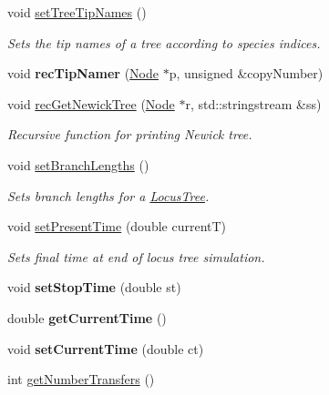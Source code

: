 \begin{DoxyCompactItemize}
void \mbox{\hyperlink{class_locus_tree_aa35f5146960c0af19975152ae6f47e8c}{set\+Tree\+Tip\+Names}} ()
\begin{DoxyCompactList}\small\item\em Sets the tip names of a tree according to species indices. \end{DoxyCompactList}\item 
\mbox{\label{class_locus_tree_ac9074deb777a4a09823a2a107ecd81c6}} 
void {\bfseries rec\+Tip\+Namer} (\mbox{\hyperlink{class_node}{Node}} $\ast$p, unsigned \&copy\+Number)
\item 
void \mbox{\hyperlink{class_locus_tree_ae7ea80d7265d1a65949f32968b1ebb89}{rec\+Get\+Newick\+Tree}} (\mbox{\hyperlink{class_node}{Node}} $\ast$r, std\+::stringstream \&ss)
\begin{DoxyCompactList}\small\item\em Recursive function for printing Newick tree. \end{DoxyCompactList}\item 
void \mbox{\hyperlink{class_locus_tree_ad6debdb569a14d29e34fa9557b9c31aa}{set\+Branch\+Lengths}} ()
\begin{DoxyCompactList}\small\item\em Sets branch lengths for a \mbox{\hyperlink{class_locus_tree}{Locus\+Tree}}. \end{DoxyCompactList}\item 
void \mbox{\hyperlink{class_locus_tree_af600f07120f0f4da36834046afd30c6b}{set\+Present\+Time}} (double currentT)
\begin{DoxyCompactList}\small\item\em Sets final time at end of locus tree simulation. \end{DoxyCompactList}\item 
\mbox{\label{class_locus_tree_a65f30de0ab5242fe10e9f0084b27b798}} 
void {\bfseries set\+Stop\+Time} (double st)
\item 
\mbox{\label{class_locus_tree_a68c138667f08a2c178d4d70ca8c4f425}} 
double {\bfseries get\+Current\+Time} ()
\item 
\mbox{\label{class_locus_tree_a7e1d46d1458f51669dd24146f938ecee}} 
void {\bfseries set\+Current\+Time} (double ct)
\item 
int \mbox{\hyperlink{class_locus_tree_a18be5f9a0732dd0e3eac0efac16bc258}{get\+Number\+Transfers}} ()

\end{DoxyCompactItemize}
